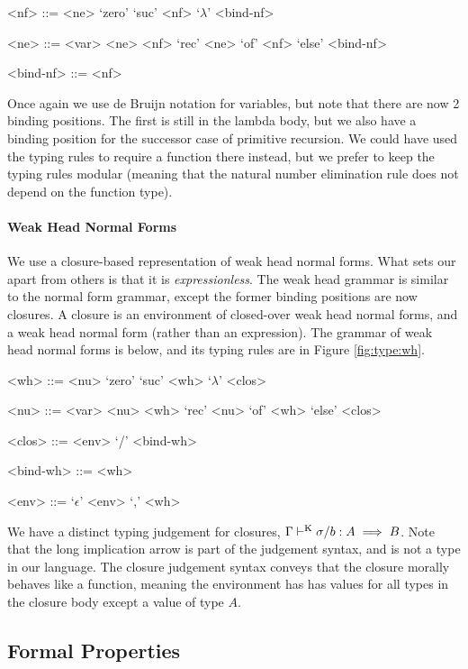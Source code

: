 \documentclass[preprint,authoryear]{sigplanconf}
\def\turnstyle{\vdash}
\def\asc{:}
\def\emp{\epsilon}
\newcommand{\con}[1]{\textmd{#1}}
\newcommand{\turn}[1]{\turnstyle^\con{#1}}
\newcommand{\typk}[3]{\Gamma \turn{K}  #1 \asc #2 \implies #3}
\newcommand{\reffig}[1]{Figure \ref{fig:#1}}
\begin{document}
\begin{grammar}
<nf> ::= <ne> 
\alt `zero'
\alt `suc' <nf>
\alt `\(\lambda\)' <bind-nf>

<ne> ::= <var> 
\alt <ne> <nf>
\alt `rec' <ne> `of' <nf> `else' <bind-nf>

<bind-nf> ::= <nf> 
\end{grammar}

Once again we use de Bruijn notation for variables, but note that
there are now 2 binding positions. The first is still in the lambda
body, but we also have a binding position for the successor case of
primitive recursion. We could have used the typing rules to require a
function there instead, but we prefer to keep the typing rules
modular (meaning that the natural number elimination rule does not
depend on the function type).

\paragraph{Weak Head Normal Forms}

We use a closure-based representation of weak head normal forms. What
sets our apart from others is that it is {\it expressionless}. The
weak head grammar is similar to the normal form grammar, except
the former binding positions are now closures. A closure is an environment of
closed-over weak head normal forms, and a weak head normal form
(rather than an expression). The grammar of weak head normal forms is below, and
its typing rules are in \reffig{type:wh}.

\begin{grammar}
<wh> ::= <nu> 
\alt `zero'
\alt `suc' <wh>
\alt `\(\lambda\)' <clos>

<nu> ::= <var> 
\alt <nu> <wh>
\alt `rec' <nu> `of' <wh> `else' <clos>

<clos> ::= <env> `/' <bind-wh>

<bind-wh> ::= <wh> 

<env> ::= `\(\emp\)'
\alt <env> `,' <wh>
\end{grammar}

We have a distinct typing judgement for closures,
$\typk{\sigma / b}{A}{B}$. Note that the long implication arrow is
part of the judgement syntax, and is not a type in our language. The
closure judgement syntax conveys that the closure morally
behaves like a function, meaning the environment has has values for
all types in the closure body except a value of type $A$.

\subsection{Formal Properties}
\end{document}
